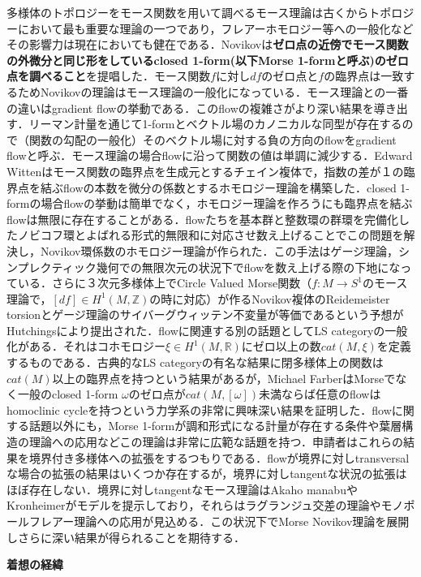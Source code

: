 \documentclass[11pt,a4j,dvipdfmx]{jarticle} 					%
\newcommand{\研究課題名}{象の卵}
\newcommand{\研究機関名}{京都大学}
\newcommand{\研究代表者氏名}{福士謙二}
\begin{document}
	多様体のトポロジーをモース関数を用いて調べるモース理論は古くからトポロジーにおいて最も重要な理論の一つであり，フレアーホモロジー等への一般化などその影響力は現在においても健在である．Novikovは\textbf{ゼロ点の近傍でモース関数の外微分と同じ形をしているclosed 1-form(以下Morse 1-formと呼ぶ)のゼロ点を調べること}を提唱した．モース関数$f$に対し$df$のゼロ点と$f$の臨界点は一致するためNovikovの理論はモース理論の一般化になっている．モース理論との一番の違いはgradient flowの挙動である．このflowの複雑さがより深い結果を導き出す．リーマン計量を通じて1-formとベクトル場のカノニカルな同型が存在するので（関数の勾配の一般化）そのベクトル場に対する負の方向のflowをgradient flowと呼ぶ．モース理論の場合flowに沿って関数の値は単調に減少する．Edward Wittenはモース関数の臨界点を生成元とするチェイン複体で，指数の差が１の臨界点を結ぶflowの本数を微分の係数とするホモロジー理論を構築した．closed 1-formの場合flowの挙動は簡単でなく，ホモロジー理論を作ろうにも臨界点を結ぶflowは無限に存在することがある．flowたちを基本群と整数環の群環を完備化したノビコフ環とよばれる形式的無限和に対応させ数え上げることでこの問題を解決し，Novikov環係数のホモロジー理論が作られた．この手法はゲージ理論，シンプレクティック幾何での無限次元の状況下でflowを数え上げる際の下地になっている．さらに３次元多様体上でCircle Valued Morse関数$（f:M \rightarrow S^1$のモース理論で，$[df]\in H^1(M,\mathbb{Z})$の時に対応）が作るNovikov複体のReidemeister torsionとゲージ理論のサイバーグウィッテン不変量が等価であるという予想がHutchingsにより提出された．flowに関連する別の話題としてLS categoryの一般化がある．それはコホモロジー$\xi \in H^1(M,\mathbb{R})$にゼロ以上の数$cat(M,\xi)$を定義するものである．古典的なLS categoryの有名な結果に閉多様体上の関数は$cat(M)$以上の臨界点を持つという結果があるが，Michael FarberはMorseでなく一般のclosed 1-form  $\omega$のゼロ点が$cat(M,[\omega])$未満ならば任意のflowはhomoclinic cycleを持つという力学系の非常に興味深い結果を証明した．flowに関する話題以外にも，Morse 1-formが調和形式になる計量が存在する条件や葉層構造の理論への応用などこの理論は非常に広範な話題を持つ．申請者はこれらの結果を境界付き多様体への拡張をするつもりである．flowが境界に対しtransversalな場合の拡張の結果はいくつか存在するが，境界に対しtangentな状況の拡張はほぼ存在しない．境界に対しtangentなモース理論はAkaho manabuやKronheimerがモデルを提示しており，それらはラグランジュ交差の理論やモノポールフレアー理論への応用が見込める．この状況下でMorse Novikov理論を展開しさらに深い結果が得られることを期待する．

\vspace{4mm}
\noindent\Large
	\textbf{着想の経緯}\normalsize
	\vspace{2mm}
\end{document}

